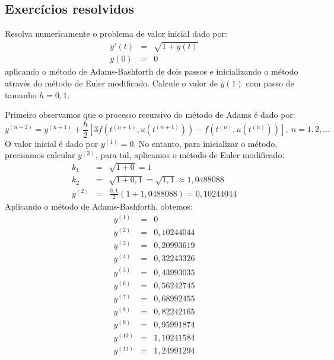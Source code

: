 \subsection*{Exercícios resolvidos}
\begin{exeresol}\label{exeresol:Adams_Bashforth:prob1} Resolva numericamente o problema de valor inicial dado por:
\begin{eqnarray}
 y'(t)&=& \sqrt{1+y(t)}\\
 y(0)&=& 0
\end{eqnarray}
aplicando o método de Adams-Bashforth de dois passos e inicializando o método através do método de Euler modificado. Calcule o valor de $y(1)$ com passo de tamanho $h=0,1$.
\end{exeresol}
\begin{resol}
Primeiro observamos que o processo recursivo do método de Adams é dado por:
\begin{equation}
  y^{(n+2)}=y^{(n+1)}+\frac{h}{2}\left[3f\left(t^{(n+1)},u(t^{(n+1)})\right)-f\left(t^{(n)},u(t^{(n)})\right)\right],~n=1,2,\ldots
 \end{equation}
O valor inicial é dado por $y^{(1)}=0$. No entanto, para inicializar o método, precisamos calcular $y^{(2)}$, para tal, aplicamos o método de Euler modificado:
\begin{eqnarray}
 k_1&=&\sqrt{1+0}=1\\
 k_2&=&\sqrt{1+0,1}=\sqrt{1,1}\approx 1,0488088 \\
 y^{(2)}&=& \frac{0,1}{2}\left(1+1,0488088 \right)=0,10244044
  \end{eqnarray}
Aplicando o método de Adams-Bashforth, obtemos:
  \begin{eqnarray}
 y^{(1)}&=&0\\
 y^{(2)}&=&0,10244044\\
 y^{(3)}&=&0,20993619\\
 y^{(4)}&=&0,32243326\\
 y^{(5)}&=&0,43993035\\
 y^{(6)}&=&0,56242745\\
 y^{(7)}&=&0,68992455\\
 y^{(8)}&=&0,82242165\\
 y^{(9)}&=&0,95991874\\
 y^{(10)}&=&1,10241584\\
 y^{(11)}&=&1,24991294
  \end{eqnarray}
\end{resol}

